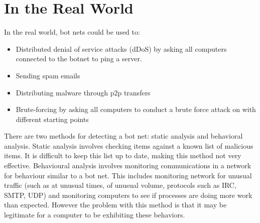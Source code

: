 \documentclass[9pt,a4paper]{article}
\begin{document}
\section{In the Real World}
\vspace{-2ex}
In the real world, bot nets could be used to:
\begin{itemize}
\item Distributed denial of service attacks (dDoS) by asking all computers connected to the botnet to ping a server.
\item Sending spam emails
\item Distributing malware through p2p transfers
\item Brute-forcing by asking all computers to conduct a brute force attack on with different starting points
\end{itemize}

There are two methods for detecting a bot net: static analysis and behavioral analysis. Static analysis involves checking items against a known list of malicious items. It is difficult to keep this list up to date, making this method not very effective. Behavioural analysis involves monitoring communications in a network for behaviour similar to a bot net. This includes  monitoring network for unusual traffic (such as at unusual times, of unusual volume, protocols such as IRC, SMTP, UDP) and monitoring computers to see if processes are doing more work than expected. However the problem with this method is that it may be legitimate for a computer to be exhibiting these behaviors.
\end{document}
